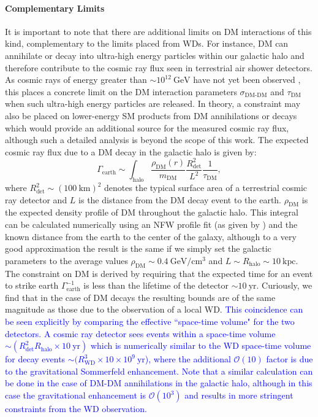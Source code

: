 \documentclass[preprintnumbers,amsmath,amssymb,prd, superscriptaddress,twocolumn]{revtex4}
\newcommand{\OO}{\mathcal{O}}
\newcommand{\GeV}{\text{GeV}}
\newcommand{\cm}{\text{cm}}
\begin{document}
\paragraph{Complementary Limits}
It is important to note that there are additional limits on DM interactions of this kind, complementary to the limits placed from WDs.
For instance, DM can annihilate or decay into ultra-high energy particles within our galactic halo and therefore contribute to the cosmic ray flux seen in terrestrial air shower detectors.
As cosmic rays of energy greater than $\sim 10^{12} ~\GeV$ have not yet been observed \cite{ThePierreAuger:2015rha, AbuZayyad:2012ru}, this places a concrete limit on the DM interaction parameters $\sigma_\text{DM-DM}$ and $\tau_\text{DM}$ when such ultra-high energy particles are released.
In theory, a constraint may also be placed on lower-energy SM products from DM annihilations or decays which would provide an additional source for the measured cosmic ray flux, although such a detailed analysis is beyond the scope of this work.
The expected cosmic ray flux due to a DM decay in the galactic halo is given by:
\begin{equation}
\Gamma_\text{earth} \sim \int_{\text{halo}} \frac{\rho_\text{DM}(r)}{m_\text{DM}} \frac{R_\text{det}^2}{L^2} \frac{1}{\tau_\text{DM}},
\end{equation}
where $R_\text{det}^2 \sim (100 ~\text{km})^2$ denotes the typical surface area of a terrestrial cosmic ray detector and $L$ is the distance from the DM decay event to the earth.
$\rho_\text{DM}$ is the expected density profile of DM throughout the galactic halo.
This integral can be calculated numerically using an NFW profile fit (as given by \cite{Nesti:2013uwa}) and the known distance from the earth to the center of the galaxy, although to a very good approximation the result is the same if we simply set the galactic parameters to the average values $\rho_\text{DM} \sim 0.4 ~\GeV/\cm^3$ and $L \sim R_\text{halo} \sim 10 ~\text{kpc}$.
The constraint on DM is derived by requiring that the expected time for an event to strike earth $\Gamma_\text{earth}^{-1}$ is less than the lifetime of the detector $\sim 10 ~\text{yr}$.
Curiously, we find that in the case of DM decays the resulting bounds are of the same magnitude as those due to the observation of a local WD.
\textcolor{blue}{This coincidence can be seen explicitly by comparing the effective ``space-time volume" for the two detectors.
A cosmic ray detector sees events within a space-time volume $\sim (R_\text{det}^2 R_\text{halo} \times 10 ~\text{yr})$ which is numerically similar to the WD space-time volume for decay events $\sim (R_\text{WD}^3 \times 10 \times 10^9 ~\text{yr}$), where the additional $\OO(10)$ factor is due to the gravitational Sommerfeld enhancement.
Note that a similar calculation can be done in the case of DM-DM annihilations in the galactic halo, although in this case the gravitational enhancement is $\OO(10^3)$ and results in more stringent constraints from the WD observation.}
\end{document}

